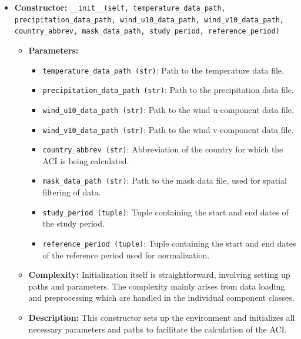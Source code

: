 \documentclass[a4paper,12pt]{article}
\begin{document}
\begin{itemize}
    \item \textbf{Constructor:} \texttt{\_\_init\_\_(self, temperature\_data\_path, precipitation\_data\_path, wind\_u10\_data\_path, wind\_v10\_data\_path, country\_abbrev, mask\_data\_path, study\_period, reference\_period)}
    \begin{itemize}
        \item \textbf{Parameters:}
        \begin{itemize}
            \item \texttt{temperature\_data\_path (str)}: Path to the temperature data file.
            \item \texttt{precipitation\_data\_path (str)}: Path to the precipitation data file.
            \item \texttt{wind\_u10\_data\_path (str)}: Path to the wind u-component data file.
            \item \texttt{wind\_v10\_data\_path (str)}: Path to the wind v-component data file.
            \item \texttt{country\_abbrev (str)}: Abbreviation of the country for which the ACI is being calculated.
            \item \texttt{mask\_data\_path (str)}: Path to the mask data file, used for spatial filtering of data.
            \item \texttt{study\_period (tuple)}: Tuple containing the start and end dates of the study period.
            \item \texttt{reference\_period (tuple)}: Tuple containing the start and end dates of the reference period used for normalization.
        \end{itemize}
        \item \textbf{Complexity:} Initialization itself is straightforward, involving setting up paths and parameters. The complexity mainly arises from data loading and preprocessing which are handled in the individual component classes.
        \item \textbf{Description:} This constructor sets up the environment and initializes all necessary parameters and paths to facilitate the calculation of the ACI.
    \end{itemize}


\end{itemize}
\end{document}
